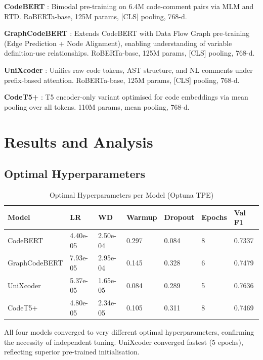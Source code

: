\documentclass[12pt, a4paper]{report}
\begin{document}
\textbf{CodeBERT} \cite{codebert}: Bimodal pre-training on 6.4M code-comment pairs via MLM and RTD. RoBERTa-base, 125M params, [CLS] pooling, 768-d.

\textbf{GraphCodeBERT} \cite{graphcodebert}: Extends CodeBERT with Data Flow Graph pre-training (Edge Prediction + Node Alignment), enabling understanding of variable definition-use relationships. RoBERTa-base, 125M params, [CLS] pooling, 768-d.

\textbf{UniXcoder} \cite{unixcoder}: Unifies raw code tokens, AST structure, and NL comments under prefix-based attention. RoBERTa-base, 125M params, [CLS] pooling, 768-d.

\textbf{CodeT5+} \cite{codet5p}: T5 encoder-only variant optimised for code embeddings via mean pooling over all tokens. 110M params, mean pooling, 768-d.

\clearpage
\chapter{Results and Analysis}

\section{Optimal Hyperparameters}

\begin{table}[h!]
\centering
\caption{Optimal Hyperparameters per Model (Optuna TPE)}
\label{tab:hparams}
\begin{tabular}{L{3cm} C{2cm} C{2cm} C{2cm} C{1.5cm} C{1.5cm} C{1.8cm}}
\toprule
\textbf{Model} & \textbf{LR} & \textbf{WD} & \textbf{Warmup} & \textbf{Dropout} & \textbf{Epochs} & \textbf{Val F1} \\
\midrule
CodeBERT       & 4.40e-05 & 2.50e-04 & 0.297 & 0.084 & 8 & 0.7337 \\
GraphCodeBERT  & 7.93e-05 & 2.95e-04 & 0.145 & 0.328 & 6 & 0.7479 \\
UniXcoder      & 5.37e-05 & 1.65e-05 & 0.084 & 0.289 & 5 & 0.7636 \\
CodeT5+        & 4.80e-05 & 2.34e-05 & 0.105 & 0.311 & 8 & 0.7469 \\
\bottomrule
\end{tabular}
\end{table}

All four models converged to very different optimal hyperparameters, confirming the necessity of independent tuning. UniXcoder converged fastest (5 epochs), reflecting superior pre-trained initialisation.
\end{document}
